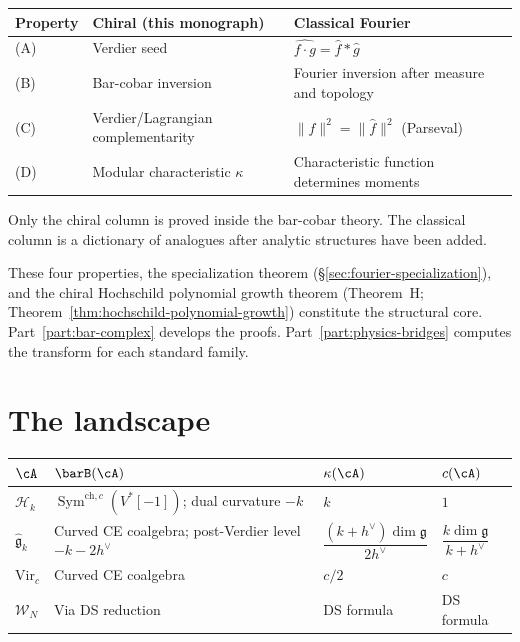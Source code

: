 \begin{remark}
\label{rem:fourier-classical-analogues}
\begin{center}
\small
\begin{tabular}{lll}
\textbf{Property}
 & \textbf{Chiral (this monograph)}
 & \textbf{Classical Fourier} \\
\hline
(A) & Verdier seed
 & $\widehat{f \cdot g} = \hat{f} * \hat{g}$ \\
(B) & Bar-cobar inversion
 & Fourier inversion after measure and topology \\
(C) & Verdier/Lagrangian complementarity
 & $\|f\|^2 = \|\hat{f}\|^2$ (Parseval) \\
(D) & Modular characteristic $\kappa$
 & Characteristic function determines moments
\end{tabular}
\end{center}
Only the chiral column is proved inside the bar-cobar theory. The
classical column is a dictionary of analogues after analytic structures have
been added.
\end{remark}

\begin{remark}\label{rem:fourier-scope}
These four properties, the specialization theorem
(\S\ref{sec:fourier-specialization}), and the chiral Hochschild polynomial
growth theorem (Theorem~H;
Theorem~\ref{thm:hochschild-polynomial-growth})
constitute the structural core.
Part~\ref{part:bar-complex} develops the proofs. Part~\ref{part:physics-bridges} computes the transform for each
standard family.
\end{remark}


\section{The landscape}\label{sec:fourier-landscape}

\begin{center}
\small
\begin{tabular}{llll}
\textbf{$\cA$}
 & \textbf{$\barB(\cA)$}
 & \textbf{$\kappa(\cA)$}
 & \textbf{$c(\cA)$} \\
\hline
$\mathcal{H}_k$
 & $\operatorname{Sym}^{\mathrm{ch},c}(V^*[-1])$; dual curvature $-k$
 & $k$
 & $1$ \\[2pt]
$\widehat{\mathfrak{g}}_k$
 & Curved CE coalgebra; post-Verdier level $-k - 2h^\vee$
 & $\dfrac{(k + h^\vee)\dim\mathfrak{g}}{2h^\vee}$
 & $\dfrac{k\dim\mathfrak{g}}{k + h^\vee}$ \\[6pt]
$\mathrm{Vir}_c$
 & Curved CE coalgebra
 & $c/2$
 & $c$ \\[2pt]
$\mathcal{W}_N$
 & Via DS reduction
 & DS formula
 & DS formula
\end{tabular}
\end{center}

